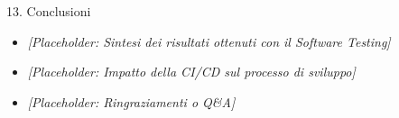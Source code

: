 \documentclass[aspectratio=169, 10pt]{beamer}
\begin{document}
\begin{frame}{13. Conclusioni}
  \begin{itemize}
    \item \textit{[Placeholder: Sintesi dei risultati ottenuti con il Software Testing]}
    \item \textit{[Placeholder: Impatto della CI/CD sul processo di sviluppo]}
    \item \textit{[Placeholder: Ringraziamenti o Q\&A]}
  \end{itemize}
\end{frame}
\end{document}
